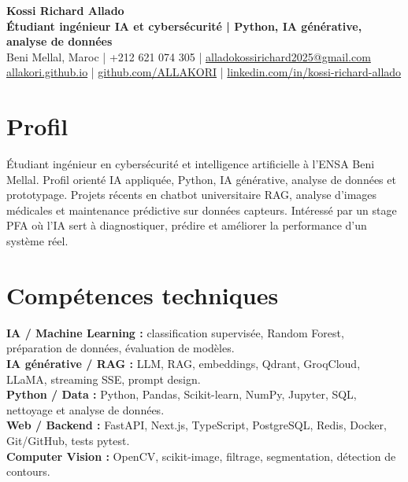 \documentclass[10pt,a4paper]{article}
\begin{document}
{\LARGE \textbf{Kossi Richard Allado}}\\
\textbf{Étudiant ingénieur IA et cybersécurité | Python, IA générative, analyse de données}\\
Beni Mellal, Maroc | +212 621 074 305 | \href{mailto:alladokossirichard2025@gmail.com}{alladokossirichard2025@gmail.com}\\
\href{https://allakori.github.io/}{allakori.github.io} | \href{https://github.com/ALLAKORI}{github.com/ALLAKORI} | \href{https://www.linkedin.com/in/kossi-richard-allado-50177b2a5}{linkedin.com/in/kossi-richard-allado}

\section{Profil}
Étudiant ingénieur en cybersécurité et intelligence artificielle à l'ENSA Beni Mellal. Profil orienté IA appliquée, Python, IA générative, analyse de données et prototypage. Projets récents en chatbot universitaire RAG, analyse d'images médicales et maintenance prédictive sur données capteurs. Intéressé par un stage PFA où l'IA sert à diagnostiquer, prédire et améliorer la performance d'un système réel.

\section{Compétences techniques}
\textbf{IA / Machine Learning :} classification supervisée, Random Forest, préparation de données, évaluation de modèles.\\
\textbf{IA générative / RAG :} LLM, RAG, embeddings, Qdrant, GroqCloud, LLaMA, streaming SSE, prompt design.\\
\textbf{Python / Data :} Python, Pandas, Scikit-learn, NumPy, Jupyter, SQL, nettoyage et analyse de données.\\
\textbf{Web / Backend :} FastAPI, Next.js, TypeScript, PostgreSQL, Redis, Docker, Git/GitHub, tests pytest.\\
\textbf{Computer Vision :} OpenCV, scikit-image, filtrage, segmentation, détection de contours.
\end{document}
